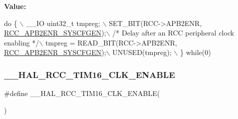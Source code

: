 {\bfseries Value\+:}
\begin{DoxyCode}
\textcolor{keywordflow}{do} \{ \(\backslash\)
                                        \_\_IO uint32\_t tmpreg; \(\backslash\)
                                        SET\_BIT(RCC->APB2ENR, 
      \hyperlink{group___peripheral___registers___bits___definition_ga7a9d56a8aa1fa0f519ecbdf0d19dd4da}{RCC\_APB2ENR\_SYSCFGEN});\(\backslash\)
                                        \textcolor{comment}{/* Delay after an RCC peripheral clock enabling */}\(\backslash\)
                                        tmpreg = READ\_BIT(RCC->APB2ENR, 
      \hyperlink{group___peripheral___registers___bits___definition_ga7a9d56a8aa1fa0f519ecbdf0d19dd4da}{RCC\_APB2ENR\_SYSCFGEN});\(\backslash\)
                                        UNUSED(tmpreg); \(\backslash\)
                                      \} \textcolor{keywordflow}{while}(0)
\end{DoxyCode}
\mbox{\label{group___r_c_c___a_p_b2___clock___enable___disable_ga9753b09f531d9d48d31abd4f74c26d26}} 
\subsubsection{\texorpdfstring{\+\_\+\+\_\+\+H\+A\+L\+\_\+\+R\+C\+C\+\_\+\+T\+I\+M16\+\_\+\+C\+L\+K\+\_\+\+E\+N\+A\+B\+LE}{\_\_HAL\_RCC\_TIM16\_CLK\_ENABLE}}
{\footnotesize\ttfamily \#define \+\_\+\+\_\+\+H\+A\+L\+\_\+\+R\+C\+C\+\_\+\+T\+I\+M16\+\_\+\+C\+L\+K\+\_\+\+E\+N\+A\+B\+LE(\begin{DoxyParamCaption}{ }\end{DoxyParamCaption})}

